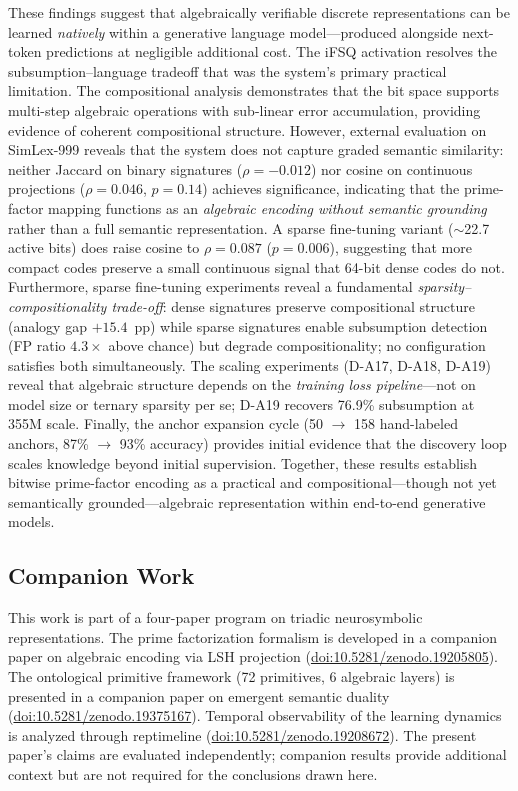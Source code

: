 \documentclass[11pt,a4paper]{article}
\begin{document}
These findings suggest that algebraically verifiable discrete representations can be learned \emph{natively} within a generative language model---produced alongside next-token predictions at negligible additional cost. The iFSQ activation resolves the subsumption--language tradeoff that was the system's primary practical limitation. The compositional analysis demonstrates that the bit space supports multi-step algebraic operations with sub-linear error accumulation, providing evidence of coherent compositional structure. However, external evaluation on SimLex-999 reveals that the system does not capture graded semantic similarity: neither Jaccard on binary signatures ($\rho = -0.012$) nor cosine on continuous projections ($\rho = 0.046$, $p = 0.14$) achieves significance, indicating that the prime-factor mapping functions as an \emph{algebraic encoding without semantic grounding} rather than a full semantic representation. A sparse fine-tuning variant ($\sim$22.7 active bits) does raise cosine to $\rho = 0.087$ ($p = 0.006$), suggesting that more compact codes preserve a small continuous signal that 64-bit dense codes do not. Furthermore, sparse fine-tuning experiments reveal a fundamental \emph{sparsity--compositionality trade-off}: dense signatures preserve compositional structure (analogy gap $+15.4$~pp) while sparse signatures enable subsumption detection (FP ratio $4.3\times$ above chance) but degrade compositionality; no configuration satisfies both simultaneously. The scaling experiments (D-A17, D-A18, D-A19) reveal that algebraic structure depends on the \emph{training loss pipeline}---not on model size or ternary sparsity per se; D-A19 recovers 76.9\% subsumption at 355M scale. Finally, the anchor expansion cycle (50 $\to$ 158 hand-labeled anchors, 87\% $\to$ 93\% accuracy) provides initial evidence that the discovery loop scales knowledge beyond initial supervision. Together, these results establish bitwise prime-factor encoding as a practical and compositional---though not yet semantically grounded---algebraic representation within end-to-end generative models.


\subsection*{Companion Work}

This work is part of a four-paper program on triadic neurosymbolic representations. The prime factorization formalism is developed in a companion paper on algebraic encoding via LSH projection (\href{https://doi.org/10.5281/zenodo.19205805}{doi:10.5281/zenodo.19205805}). The ontological primitive framework (72 primitives, 6 algebraic layers) is presented in a companion paper on emergent semantic duality (\href{https://doi.org/10.5281/zenodo.19375167}{doi:10.5281/zenodo.19375167}). Temporal observability of the learning dynamics is analyzed through reptimeline (\href{https://doi.org/10.5281/zenodo.19208672}{doi:10.5281/zenodo.19208672}). The present paper's claims are evaluated independently; companion results provide additional context but are not required for the conclusions drawn here.
\end{document}

